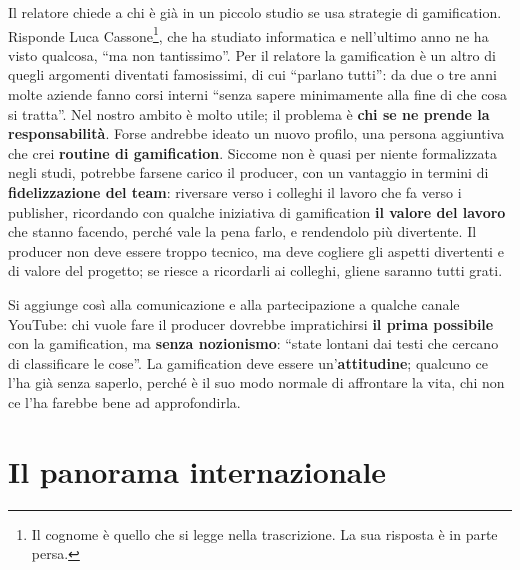Il relatore chiede a chi è già in un piccolo studio se usa strategie di
gamification. Risponde Luca Cassone\footnote{Il cognome è quello che si legge
nella trascrizione. La sua risposta è in parte persa.}, che ha studiato
informatica e nell'ultimo anno ne ha visto qualcosa, ``ma non tantissimo''.
Per il relatore la gamification è un altro di quegli argomenti diventati
famosissimi, di cui ``parlano tutti'': da due o tre anni molte aziende fanno
corsi interni ``senza sapere minimamente alla fine di che cosa si tratta''. Nel
nostro ambito è molto utile; il problema è \textbf{chi se ne prende la
responsabilità}. Forse andrebbe ideato un nuovo profilo, una persona aggiuntiva
che crei \textbf{routine di gamification}. Siccome non è quasi per niente
formalizzata negli studi, potrebbe farsene carico il producer, con un vantaggio
in termini di \textbf{fidelizzazione del team}: riversare verso i colleghi il
lavoro che fa verso i publisher, ricordando con qualche iniziativa di
gamification \textbf{il valore del lavoro} che stanno facendo, perché vale la
pena farlo, e rendendolo più divertente. Il producer non deve essere troppo
tecnico, ma deve cogliere gli aspetti divertenti e di valore del progetto; se
riesce a ricordarli ai colleghi, gliene saranno tutti grati.

Si aggiunge così alla comunicazione e alla partecipazione a qualche canale
YouTube: chi vuole fare il producer dovrebbe impratichirsi \textbf{il prima
possibile} con la gamification, ma \textbf{senza nozionismo}: ``state lontani dai
testi che cercano di classificare le cose''. La gamification deve essere
un'\textbf{attitudine}; qualcuno ce l'ha già senza saperlo, perché è il suo modo
normale di affrontare la vita, chi non ce l'ha farebbe bene ad approfondirla.

\section{Il panorama internazionale}
\label{sec:z5-panorama}

